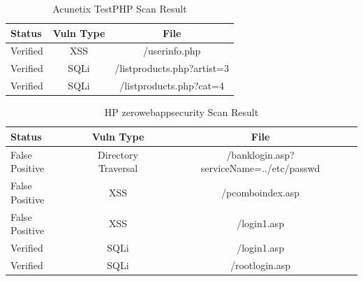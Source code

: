\documentclass[12pt,a4paper]{article}
\begin{document}
\begin{center}
    \begin{table}
        \caption{Acunetix TestPHP Scan Result}
        \begin{center}
            \begin{tabular}{ | l | c | c | }
                \hline
                Status & Vuln Type & File \\ \hline
                Verified & XSS & /userinfo.php \\ \hline
                Verified & SQLi & /listproducts.php?artist=3 \\ \hline
                Verified & SQLi & /listproducts.php?cat=4 \\ 
                \hline
            \end{tabular}
        \end{center}
        \label{tab:acunetix2}
    \end{table}
\end{center}

\begin{center}
    \begin{table}
        \caption{HP zerowebappsecurity Scan Result}
        \begin{center}
            \begin{tabular}{ | l | c | c | }
                \hline
                Status & Vuln Type & File \\ \hline
                False Positive & Directory Traversal & /banklogin.asp?serviceName=../etc/passwd \\ \hline
                False Positive & XSS & /pcomboindex.asp \\ \hline
                False Positive & XSS & /login1.asp \\ \hline
                Verified & SQLi & /login1.asp \\ \hline
                Verified & SQLi & /rootlogin.asp \\
                \hline
            \end{tabular}
        \end{center}
        \label{tab:zerowebappsec}
    \end{table}
\end{center}
\end{document}

